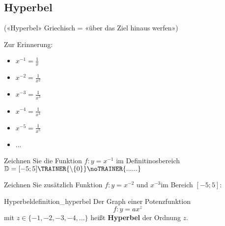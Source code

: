 
\subsection{Hyperbel}

(«Hyperbel» Griechisch = «über das Ziel hinaus werfen»)


Zur Erinnerung:
\begin{multicols}{2}
\begin{itemize}
	\item $x^{-1} = \frac{1}{x}$
	\item $x^{-2} = \frac{1}{x^2}$
	\item $x^{-3} = \frac{1}{x^3}$
	\item $x^{-4} = \frac{1}{x^4}$
	\item $x^{-5} = \frac{1}{x^5}$
  \item ...
\end{itemize}
\end{multicols}

Zeichnen Sie die Funktion $f: y = x^{-1}$ im Definitinosbereich
$\mathbb{D} = [-5;5]\TRAINER{\backslash \{0\}}\noTRAINER{......}$


\newpage


Zeichnen Sie zusätzlich Funktion $f: y = x^{-2}$  und $x^{-3}$im Bereich $[-5;5]$:


\begin{definition}{Hyperbel}{definition_hyperbel}
  Der Graph einer Potenzfunktion $$f: y=ax^z$$
  mit $z \in \{-1, -2, -3, -4, ...\}$ heißt
\textbf{Hyperbel} der Ordnung $z$.
\end{definition}

